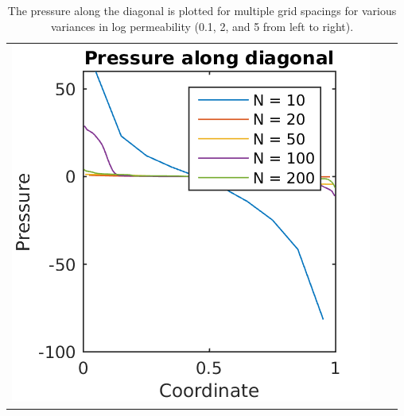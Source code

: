\documentclass{article}
\begin{document}
\begin{table}[!h]
\begin{tabular}{c c c}
\includegraphics[scale=0.75]{figs/pressure_50.png}
\end{tabular}
\caption{The pressure along the diagonal is plotted for multiple grid spacings for various variances in log permeability (0.1, 2, and 5 from left to right).}
\end{table}



% 
\end{document}
